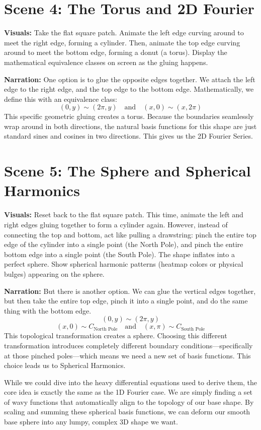 \documentclass[12pt]{article}
\begin{document}
\section*{Scene 4: The Torus and 2D Fourier}
\textbf{Visuals:}
Take the flat square patch. Animate the left edge curving around to meet the right edge, forming a cylinder. Then, animate the top edge curving around to meet the bottom edge, forming a donut (a torus). 
Display the mathematical equivalence classes on screen as the gluing happens.

\textbf{Narration:}
One option is to glue the opposite edges together. We attach the left edge to the right edge, and the top edge to the bottom edge. Mathematically, we define this with an equivalence class:
$$ (0, y) \sim (2\pi, y) \quad \text{and} \quad (x, 0) \sim (x, 2\pi) $$
This specific geometric gluing creates a torus. Because the boundaries seamlessly wrap around in both directions, the natural basis functions for this shape are just standard sines and cosines in two directions. This gives us the 2D Fourier Series.

\section*{Scene 5: The Sphere and Spherical Harmonics}
\textbf{Visuals:}
Reset back to the flat square patch. This time, animate the left and right edges gluing together to form a cylinder again. However, instead of connecting the top and bottom, act like pulling a drawstring: pinch the entire top edge of the cylinder into a single point (the North Pole), and pinch the entire bottom edge into a single point (the South Pole). The shape inflates into a perfect sphere. 
Show spherical harmonic patterns (heatmap colors or physical bulges) appearing on the sphere.

\textbf{Narration:}
But there is another option. We can glue the vertical edges together, but then take the entire top edge, pinch it into a single point, and do the same thing with the bottom edge.
$$ (0, y) \sim (2\pi, y) $$
$$ (x, 0) \sim C_{\text{North Pole}} \quad \text{and} \quad (x, \pi) \sim C_{\text{South Pole}} $$
This topological transformation creates a sphere. Choosing this different transformation introduces completely different boundary conditions—specifically at those pinched poles—which means we need a new set of basis functions. This choice leads us to Spherical Harmonics. 

While we could dive into the heavy differential equations used to derive them, the core idea is exactly the same as the 1D Fourier case. We are simply finding a set of wavy functions that automatically align to the topology of our base shape. By scaling and summing these spherical basis functions, we can deform our smooth base sphere into any lumpy, complex 3D shape we want.
\end{document}
